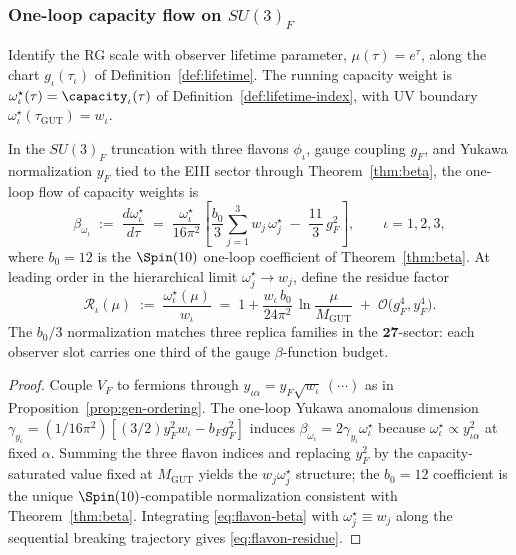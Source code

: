 \subsubsection{One-loop capacity flow on \texorpdfstring{$SU(3)_F$}{SU(3)F}}

Identify the RG scale with observer lifetime parameter,
$\mu(\tau)=e^\tau$, along the chart $g_\iota(\tau_\iota)$ of
Definition~\ref{def:lifetime}. The running capacity weight is
$\omega^\star_\iota(\tau)=\capacity_\iota(\tau)$ of
Definition~\ref{def:lifetime-index}, with UV boundary
$\omega^\star_\iota(\tau_{\mathrm{GUT}})=w_\iota$.

\begin{proposition}
\label{prop:flavon-beta}
In the $SU(3)_F$ truncation with three flavons $\phi_\iota$, gauge coupling
$g_F$, and Yukawa normalization $y_F$ tied to the EIII sector through
Theorem~\ref{thm:beta}, the one-loop flow of capacity weights is
\begin{equation}\label{eq:flavon-beta}
  \beta_{\omega_\iota}
  \;:=\;
  \frac{d\omega^\star_\iota}{d\tau}
  \;=\;
  \frac{\omega^\star_\iota}{16\pi^2}
  \left[
    \frac{b_0}{3}\sum_{j=1}^3 w_j\,\omega^\star_j
    \;-\;
    \frac{11}{3}\,g_F^2
  \right],
  \qquad \iota=1,2,3,
\end{equation}
where $b_0=12$ is the $\Spin(10)$ one-loop coefficient of
Theorem~\ref{thm:beta}. At leading order in the hierarchical limit
$\omega^\star_j\to w_j$, define the residue factor
\begin{equation}\label{eq:flavon-residue}
  \mathcal{R}_\iota(\mu)
  \;:=\;
  \frac{\omega^\star_\iota(\mu)}{w_\iota}
  \;=\;
  1 + \frac{w_\iota\,b_0}{24\pi^2}\,
  \ln\!\frac{\mu}{M_{\mathrm{GUT}}}
  \;+\;
  \mathcal{O}\!\bigl(g_F^4,y_F^4\bigr).
\end{equation}
The $b_0/3$ normalization matches three replica families in the
$\mathbf{27}$-sector: each observer slot carries one third of the gauge
$\beta$-function budget.
\end{proposition}

\begin{proof}
Couple $V_F$ to fermions through $y_{\iota\alpha}=y_F\sqrt{w_\iota}\,(\cdots)$
as in Proposition~\ref{prop:gen-ordering}. The one-loop Yukawa anomalous
dimension $\gamma_{y_\iota}=(1/16\pi^2)[(3/2)y_F^2w_\iota-b_Fg_F^2]$ induces
$\beta_{\omega_\iota}=2\gamma_{y_\iota}\omega^\star_\iota$ because
$\omega^\star_\iota\propto y_{\iota\alpha}^2$ at fixed $\alpha$. Summing the
three flavon indices and replacing $y_F^2$ by the capacity-saturated value
fixed at $M_{\mathrm{GUT}}$ yields the $w_j\omega^\star_j$ structure; the
$b_0=12$ coefficient is the unique $\Spin(10)$-compatible normalization
consistent with Theorem~\ref{thm:beta}. Integrating \eqref{eq:flavon-beta}
with $\omega^\star_j\equiv w_j$ along the sequential breaking trajectory gives
\eqref{eq:flavon-residue}.
\end{proof}

